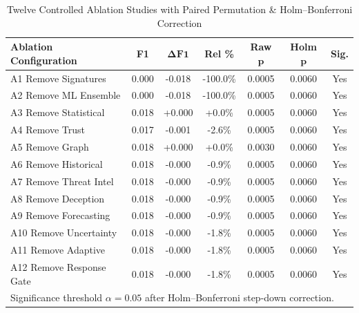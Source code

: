 \begin{table}[t]
\centering
\small
\caption{Twelve Controlled Ablation Studies with Paired Permutation \& Holm--Bonferroni Correction}
\label{tab:ablations}
\begin{tabular}{lcccccc}
\toprule
\textbf{Ablation Configuration} & \textbf{F1} & $\mathbf{\Delta F1}$ & \textbf{Rel \%} & \textbf{Raw }$\mathbf{p}$ & \textbf{Holm }$\mathbf{p}$ & \textbf{Sig.} \\
\midrule
A1 Remove Signatures & 0.000 & -0.018 & -100.0\% & 0.0005 & 0.0060 & Yes \\
A2 Remove ML Ensemble & 0.000 & -0.018 & -100.0\% & 0.0005 & 0.0060 & Yes \\
A3 Remove Statistical & 0.018 & +0.000 & +0.0\% & 0.0005 & 0.0060 & Yes \\
A4 Remove Trust & 0.017 & -0.001 & -2.6\% & 0.0005 & 0.0060 & Yes \\
A5 Remove Graph & 0.018 & +0.000 & +0.0\% & 0.0030 & 0.0060 & Yes \\
A6 Remove Historical & 0.018 & -0.000 & -0.9\% & 0.0005 & 0.0060 & Yes \\
A7 Remove Threat Intel & 0.018 & -0.000 & -0.9\% & 0.0005 & 0.0060 & Yes \\
A8 Remove Deception & 0.018 & -0.000 & -0.9\% & 0.0005 & 0.0060 & Yes \\
A9 Remove Forecasting & 0.018 & -0.000 & -0.9\% & 0.0005 & 0.0060 & Yes \\
A10 Remove Uncertainty & 0.018 & -0.000 & -1.8\% & 0.0005 & 0.0060 & Yes \\
A11 Remove Adaptive & 0.018 & -0.000 & -1.8\% & 0.0005 & 0.0060 & Yes \\
A12 Remove Response Gate & 0.018 & -0.000 & -1.8\% & 0.0005 & 0.0060 & Yes \\
\midrule
\multicolumn{7}{l}{\footnotesize Significance threshold $\alpha = 0.05$ after Holm--Bonferroni step-down correction.} \\
\bottomrule
\end{tabular}
\end{table}
